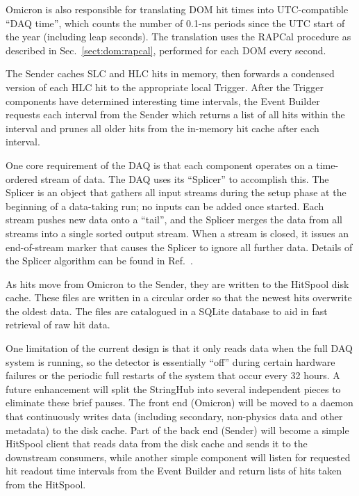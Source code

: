 Omicron is also responsible for translating DOM hit times into
UTC-compatible ``DAQ time'', which counts the number of 0.1-ns periods
since the UTC start of the year (including leap seconds).  The translation
uses the RAPCal procedure as described in Sec.~\ref{sect:dom:rapcal},
performed for each DOM every second.  

The Sender caches SLC and HLC hits in memory, then forwards a
condensed version of each HLC hit to the appropriate local Trigger. After the
Trigger components have determined interesting time intervals, 
the Event Builder requests each interval from the Sender which returns a list of
all hits within the interval and prunes all older hits from the in-memory hit
cache after each interval.

One core requirement of the DAQ is that each component operates on a
time-ordered stream of data.  The DAQ uses its ``Splicer'' to accomplish
this.  The Splicer is an object that gathers all input streams
during the setup phase at the beginning of a data-taking run; no inputs can
be added once started.  Each stream 
pushes new data onto a ``tail'', and the Splicer merges the data from all
streams into a single sorted output stream.  When a stream is closed, it
issues an end-of-stream marker that causes the Splicer to
ignore all further data.  Details of the Splicer algorithm can be found in
Ref.~\cite{vlvnt13_trigger}.  

As hits move from Omicron to the Sender, they are written to the
HitSpool disk cache.  These files are
written in a circular order so that the newest hits overwrite the oldest
data.  The files are catalogued in a SQLite database to
aid in fast retrieval of raw hit data.

One limitation of the current design is that it only reads data when
the full DAQ system is running, so the detector is essentially ``off''
during certain hardware failures or the periodic full restarts of the
system that occur every 32 hours.  A future enhancement 
will split the StringHub into several independent pieces to eliminate these
brief pauses.  The front end (Omicron) will be moved to a daemon
that continuously writes data (including secondary, non-physics data and
other metadata) to the disk cache.  Part of the back end (Sender) 
will become a simple HitSpool client that reads data from the disk cache
and sends it to the downstream consumers, while another simple component
will listen for requested hit readout time intervals from the Event Builder
and return lists of hits taken from the HitSpool.


